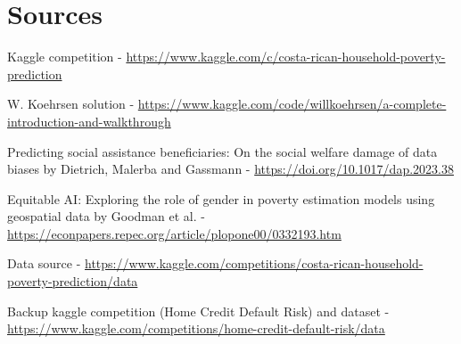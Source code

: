 \documentclass[11pt]{article}
\begin{document}
\section*{Sources}
\begin{small}
\begin{enumerate}[label={[\arabic*]},leftmargin=1.8em,itemsep=3pt]
\item Kaggle competition - \url{https://www.kaggle.com/c/costa-rican-household-poverty-prediction}
\item W. Koehrsen solution - \url{https://www.kaggle.com/code/willkoehrsen/a-complete-introduction-and-walkthrough}
\item Predicting social assistance beneficiaries: On the social welfare damage of data biases by Dietrich, Malerba and Gassmann - \url{https://doi.org/10.1017/dap.2023.38}
\item Equitable AI: Exploring the role of gender in poverty estimation models using geospatial data by Goodman et al. - \url{https://econpapers.repec.org/article/plopone00/0332193.htm}
\item Data source - \url{https://www.kaggle.com/competitions/costa-rican-household-poverty-prediction/data}
\item Backup kaggle competition (Home Credit Default Risk) and dataset - \url{https://www.kaggle.com/competitions/home-credit-default-risk/data}
\end{enumerate}
\end{small}
\end{document}
